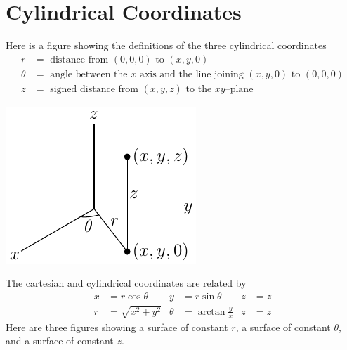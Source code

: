 \section{Cylindrical Coordinates}\label{ap:cylCoord}

Here is a figure showing the definitions of the 
three cylindrical coordinates 
\begin{align*}
r&=\text{ distance from }(0,0,0)\text{ to }(x,y,0)\\
\theta&=\text{ angle between the $x$ axis and the line joining $(x,y,0)$ to $(0,0,0)$}\\
z&=\text{ signed distance from }(x,y,z)
\text{ to the $xy$--plane}
\end{align*}
\begin{efig}
\begin{center}
    \includegraphics{cyl1.pdf}
\end{center}
\end{efig}
The cartesian and cylindrical coordinates
are related by
\begin{align*}
x&=r\cos\theta &
y&=r\sin\theta &
z&=z \\
    r&=\sqrt{x^2+y^2} &
    \theta&=\arctan\frac{y}{x} &
    z&=z
\end{align*}
Here are three figures showing a surface of constant $r$,
a surface of constant $\theta$, and a surface of constant $z$.
